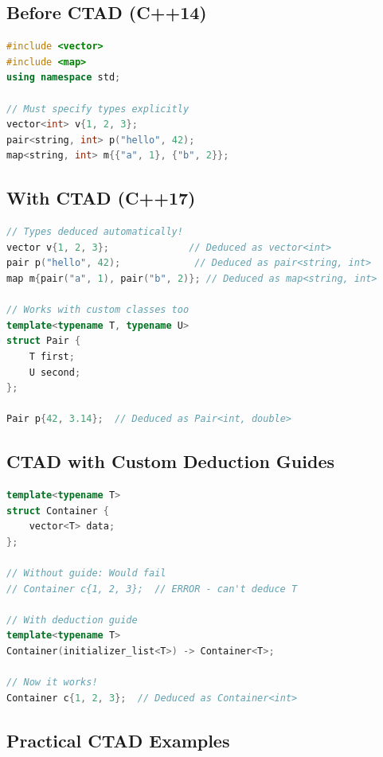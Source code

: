 \hypertarget{before-ctad-c14}{%
\subsection{Before CTAD (C++14)}\label{before-ctad-c14}}

\begin{lstlisting}[language={C++}]
#include <vector>
#include <map>
using namespace std;

// Must specify types explicitly
vector<int> v{1, 2, 3};
pair<string, int> p("hello", 42);
map<string, int> m{{"a", 1}, {"b", 2}};
\end{lstlisting}

\hypertarget{with-ctad-c17}{%
\subsection{With CTAD (C++17)}\label{with-ctad-c17}}

\begin{lstlisting}[language={C++}]
// Types deduced automatically!
vector v{1, 2, 3};              // Deduced as vector<int>
pair p("hello", 42);             // Deduced as pair<string, int>
map m{pair("a", 1), pair("b", 2)}; // Deduced as map<string, int>

// Works with custom classes too
template<typename T, typename U>
struct Pair {
    T first;
    U second;
};

Pair p{42, 3.14};  // Deduced as Pair<int, double>
\end{lstlisting}

\hypertarget{ctad-with-custom-deduction-guides}{%
\subsection{CTAD with Custom Deduction
Guides}\label{ctad-with-custom-deduction-guides}}

\begin{lstlisting}[language={C++}]
template<typename T>
struct Container {
    vector<T> data;
};

// Without guide: Would fail
// Container c{1, 2, 3};  // ERROR - can't deduce T

// With deduction guide
template<typename T>
Container(initializer_list<T>) -> Container<T>;

// Now it works!
Container c{1, 2, 3};  // Deduced as Container<int>
\end{lstlisting}

\hypertarget{practical-ctad-examples}{%
\subsection{Practical CTAD Examples}\label{practical-ctad-examples}}

